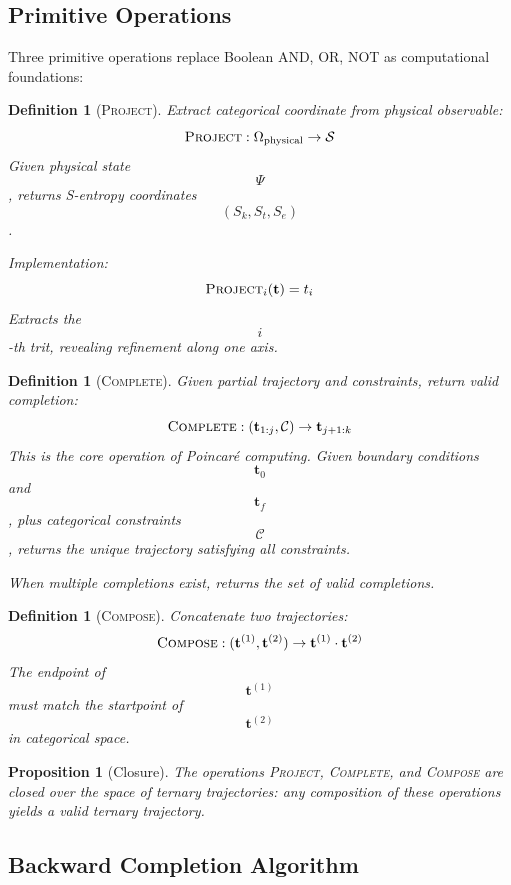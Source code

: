 \documentclass[11pt,twocolumn,a4paper]{article}
\newtheorem{definition}[theorem]{Definition}
\newtheorem{proposition}[theorem]{Proposition}
\theoremstyle{remark}
\begin{document}
\subsection{Primitive Operations}

Three primitive operations replace Boolean AND, OR, NOT as computational foundations:

\begin{definition}[\textsc{Project}]
\label{def:project}
Extract categorical coordinate from physical observable:
$$
\textsc{Project}: \Omega_{\mathrm{physical}} \to \mathcal{S}
$$
Given physical state $$\Psi$$, returns S-entropy coordinates $$(S_k, S_t, S_e)$$.

Implementation:
$$
\textsc{Project}_i(\mathbf{t}) = t_i
$$
Extracts the $$i$$-th trit, revealing refinement along one axis.
\end{definition}

\begin{definition}[\textsc{Complete}]
\label{def:complete}
Given partial trajectory and constraints, return valid completion:
$$
\textsc{Complete}: (\mathbf{t}_{1:j}, \mathcal{C}) \to \mathbf{t}_{j+1:k}
$$
This is the core operation of Poincaré computing. Given boundary conditions $$\mathbf{t}_0$$ and $$\mathbf{t}_f$$, plus categorical constraints $$\mathcal{C}$$, returns the unique trajectory satisfying all constraints.

When multiple completions exist, returns the set of valid completions.
\end{definition}

\begin{definition}[\textsc{Compose}]
\label{def:compose}
Concatenate two trajectories:
$$
\textsc{Compose}: (\mathbf{t}^{(1)}, \mathbf{t}^{(2)}) \to \mathbf{t}^{(1)} \cdot \mathbf{t}^{(2)}
$$
The endpoint of $$\mathbf{t}^{(1)}$$ must match the startpoint of $$\mathbf{t}^{(2)}$$ in categorical space.
\end{definition}

\begin{proposition}[Closure]
\label{prop:closure}
The operations \textsc{Project}, \textsc{Complete}, and \textsc{Compose} are closed over the space of ternary trajectories: any composition of these operations yields a valid ternary trajectory.
\end{proposition}

\subsection{Backward Completion Algorithm}
\end{document}
